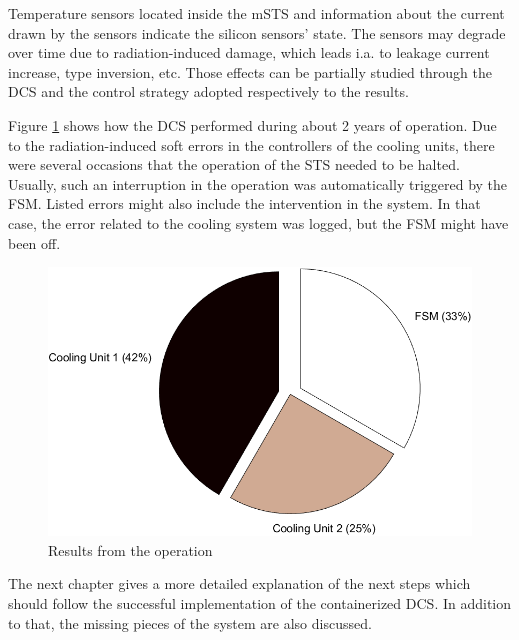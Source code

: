 Temperature sensors located inside the \gls{mSTS} and information about the current drawn by the sensors indicate the silicon sensors' state. The sensors may degrade over time due to radiation-induced damage,  which leads i.a. to leakage current increase, type inversion, etc. Those effects can be partially studied through the \gls{DCS} and the control strategy adopted respectively to the results.

Figure \ref{fig_dcs_results} shows how the \gls{DCS} performed during about 2 years of operation. Due to the radiation-induced soft errors in the controllers of the cooling units, there were several occasions that the operation of the \gls{STS} needed to be halted. Usually, such an interruption in the operation was automatically triggered by the \gls{FSM}. Listed errors might also include the intervention in the system. In that case, the error related to the cooling system was logged, but the FSM might have been off.
\begin{figure}[!h]
\centering
\includegraphics[width=0.55\columnwidth]{Chapter6/DCS/images/DCSpie.png}
\caption{Results from the operation}
\label{fig_dcs_results}
\end{figure}

The next chapter gives a more detailed explanation of the next steps which should follow the successful implementation of the containerized \gls{DCS}. In addition to that, the missing pieces of the system are also discussed.